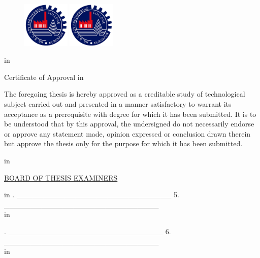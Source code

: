 \begin{titlepage}

\begin{figure}
\centering
\ifpdf
\includegraphics[width=0.2\textwidth]{NIT_Logo}   %
\else
\includegraphics[width=0.2\textwidth]{NIT_Logo}          %
\fi
\end{figure}


 in
\begin{center}
\huge Certificate of Approval
 in
\end{center}

The foregoing thesis is hereby approved as a creditable study of technological subject carried out and presented in a manner satisfactory to warrant its acceptance as a prerequisite with degree for which it has been submitted. It is to be understood that by this approval, the undersigned do not necessarily endorse or approve any statement made, opinion expressed or conclusion drawn therein but approve the thesis only for the purpose for which it has been submitted.


\begin{spacing}{1}

 in
\begin{center}
\underline {BOARD OF THESIS EXAMINERS} \\
\end{center}
 in
. \_\_\_\_\_\_\_\_\_\_\_\_\_\_\_\_\_\_\_\_\_\_\_\_\_\_\_\_\_  \hfill  5. \_\_\_\_\_\_\_\_\_\_\_\_\_\_\_\_\_\_\_\_\_\_\_\_\_\_\_\_\_ \\
 in



. \_\_\_\_\_\_\_\_\_\_\_\_\_\_\_\_\_\_\_\_\_\_\_\_\_\_\_\_\_  \hfill  6. \_\_\_\_\_\_\_\_\_\_\_\_\_\_\_\_\_\_\_\_\_\_\_\_\_\_\_\_\_ \\
 in




\end{spacing}
\end{titlepage}
